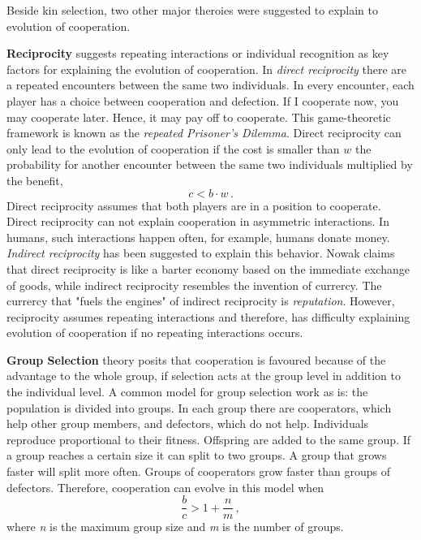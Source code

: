 \documentclass[12pt]{extarticle}
\begin{document}
Beside kin selection, two other major theroies were suggested to explain to evolution of cooperation.

\textbf{Reciprocity} suggests repeating interactions or individual recognition as key factors for explaining the evolution of cooperation. 
In \textit{direct reciprocity} there are a repeated encounters between the same two individuals. In every encounter, each player has a choice between cooperation and defection. If I cooperate now, you may cooperate later. Hence, it may pay off to cooperate.
This game-theoretic framework is known as the \emph{repeated Prisoner's Dilemma}. 
Direct reciprocity can only lead to the evolution of cooperation if the cost is smaller than $w$ the probability for another encounter between the same two individuals multiplied by the benefit, 
\begin{equation} \label{reciprocity}
c<b\cdot w \,.
\end{equation}
Direct reciprocity assumes that both players are in a position to cooperate. Direct reciprocity can not explain cooperation in asymmetric interactions\citep{su2021evolution}. In humans, such interactions happen often, for example, humans donate money. 
\textit{Indirect reciprocity} has been suggested to explain this behavior. 
Nowak \cite{nowak2006five} claims that direct reciprocity is like a barter economy based on the immediate exchange of goods, while indirect reciprocity resembles the invention of currercy. The currercy that "fuels the engines" of indirect reciprocity is \emph{reputation}. 
However, reciprocity assumes repeating interactions and therefore, has difficulty explaining evolution of cooperation if no repeating interactions occurs. 

\textbf{Group Selection} theory posits that cooperation is favoured because of the advantage to the whole group, if selection acts at the group level in addition to the individual level. A common model for group selection work as is: the population is divided into groups. In each group there are cooperators, which help other group members, and defectors, which do not help. 
Individuals reproduce proportional to their fitness. Offspring are added to the same group.
If a group reaches a certain size it can split to two groups. A group that grows faster will split more often. Groups of cooperators grow faster than groups of defectors.
Therefore, cooperation can evolve in this model when
\begin{equation} \label{groupselection}
\frac{b}{c}>1+\frac{n}{m}\, ,
\end{equation}
where \emph{n} is the maximum group size and \emph{m} is the number of groups.
\\
\end{document}

